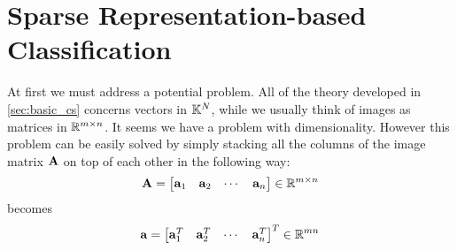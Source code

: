 \section{Sparse Representation-based Classification} \label{sec:src}
At first we must address a potential problem. All of the theory developed in \cref{sec:basic_cs} concerns vectors in $ \mathbb{K}^{N} $, while we usually think of images as matrices in $ \mathbb{R}^{m\times n} $. It seems we have a problem with dimensionality. However this problem can be easily solved by simply stacking all the columns of the image matrix $ \mathbf{A} $ on top of each other in the following way:
\[
	\mathbf{A} = \begin{bmatrix}
		\mathbf{a}_{1} & \mathbf{a}_{2} & \cdots & \mathbf{a}_{n}
	\end{bmatrix} \in \mathbb{R}^{m\times n}
\]
becomes
\[
	\mathbf{a} = \begin{bmatrix}
		\mathbf{a}_{1}^{T} &
		\mathbf{a}_{2}^{T} &
		\cdots &
		\mathbf{a}_{n}^{T}
	\end{bmatrix}^{T} \in \mathbb{R}^{mn}
\]

